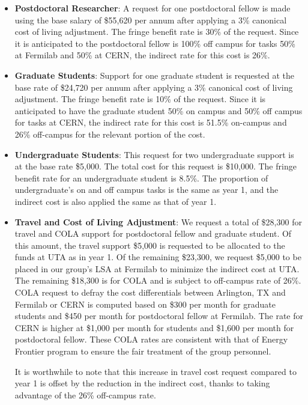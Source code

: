 \begin{enumerate}
\begin{itemize}[noitemsep,nolistsep]
\item {{\bf Postdoctoral Researcher}: A request for one postdoctoral fellow is made using the base salary of \$55,620 per annum after applying a 3\% canonical cost of living adjustment.  The fringe benefit rate is 30\% of the request.  Since it is anticipated to the postdoctoral fellow is 100\% off campus for tasks 50\% at Fermilab and 50\% at CERN, the indirect rate for this cost is 26\%.} 

\item{{\bf Graduate Students}: Support for one graduate student is requested at the base rate of \$24,720 per annum after applying a 3\% canonical cost of living adjustment.   The fringe benefit rate is 10\% of the request.  Since it is anticipated to have the graduate student 50\% on campus and 50\% off campus for tasks at CERN, the indirect rate for this cost is 51.5\% on-campus and 26\% off-campus for the relevant portion of the cost.  }

\item {{\bf Undergraduate Students}: This request for two undergraduate support is at the base rate \$5,000.  The total cost for this request is \$10,000.  The fringe benefit rate for an undergraduate student is 8.5\%.  The proportion of undergraduate’s on and off campus tasks is the same as year 1, and the indirect cost is also applied the same as that of year 1.}

\item{{\bf Travel and Cost of Living Adjustment}: We request a total of \$28,300 for travel and COLA support for postdoctoral fellow and graduate student.   Of this amount, the travel support \$5,000 is requested to be allocated to the funds at UTA as in year 1.  Of the remaining \$23,300, we request \$5,000 to be placed in our group’s LSA at Fermilab to minimize the indirect cost at UTA.   The remaining \$18,300 is for COLA and is subject to off-campus rate of 26\%.  COLA request to defray the cost differentials between Arlington, TX and Fermilab or CERN is computed based on \$300 per month for graduate students and \$450 per month for postdoctoral fellow at Fermilab.  The rate for CERN is higher at \$1,000 per month for students and \$1,600 per month for postdoctoral fellow.  These COLA rates are consistent with that of Energy Frontier program to ensure the fair treatment of the group personnel.  

It is worthwhile to note that this increase in travel cost request compared to year 1 is offset by the reduction in the indirect cost, thanks to taking advantage of the 26\% off-campus rate.}


\end{itemize}
\end{enumerate}
